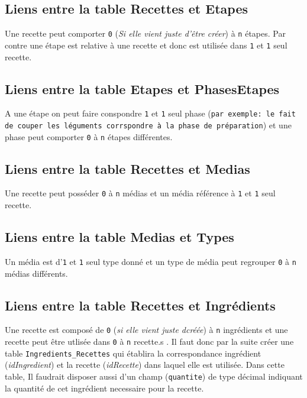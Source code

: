 \subsection{Liens entre la table Recettes et Etapes}
Une recette peut comporter \texttt{0} (\textit{Si elle vient juste d\textquoteright être créer}) à \texttt{n} étapes. Par contre une étape est relative à une recette et donc est utilisée dans \texttt{1} et \texttt{1} seul recette.

\subsection{Liens entre la table Etapes et PhasesEtapes}
A une étape on peut faire conspondre \texttt{1} et \texttt{1} seul phase (\texttt{par exemple: le fait de couper les léguments corrspondre à la phase de préparation}) et une phase peut comporter \texttt{0} à \texttt{n} étapes différentes.

\subsection{Liens entre la table Recettes et Medias}
Une recette peut posséder \texttt{0} à \texttt{n} médias et un média référence à \texttt{1} et \texttt{1} seul recette.

\subsection{Liens entre la table Medias et Types}
Un média est d\textquoteright \texttt{1} et \texttt{1} seul type donné et un type de média peut regrouper \texttt{0} à \texttt{n} médias différents.

\subsection{Liens entre la table Recettes et Ingrédients}
Une recette est composé de \texttt{0} (\textit{si elle vient juste d créée}) à \texttt{n} ingrédients et une recette peut être utlisée dans \texttt{0} à \texttt{n} recette.s . Il faut donc par la suite créer une table \texttt{Ingredients\_Recettes} qui établira la correspondance ingrédient (\textit{idIngredient}) et la recette (\textit{idRecette}) dans laquel elle est utilisée.
\newline
Dans cette table, Il faudrait disposer aussi d'un champ (\texttt{quantite}) de type décimal indiquant la quantité de cet ingrédient necessaire pour la recette.

